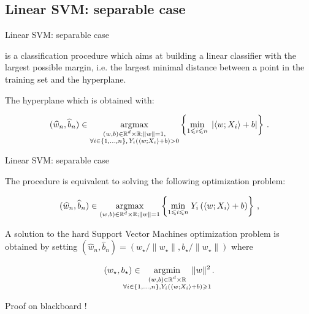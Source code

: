\documentclass[xcolor={usenames,dvipsnames}]{beamer}
\begin{document}
\subsection{Linear SVM: separable case}

\begin{frame}{Linear SVM: separable case}

  is a classification procedure which aims at  building a linear classifier with the largest possible margin, i.e. \alert{the largest minimal distance between a point in the training set and the hyperplane}.

\vspace{.5cm}

The hyperplane which  is obtained with:

\vspace{.3cm}
\[
(\widehat w_n,\widehat b_n)\in \underset{\substack{(w,b)\in\mathbb{R}^d\times \mathbb{R}; \|w\|=1,\\ \forall i\in\{1,\ldots,n\},\, Y_i\left(\langle w; X_i\rangle + b\right) > 0}}{\operatorname{argmax}}\left\{\underset{1\leqslant i \leqslant n}{\min}\;\left|\langle w; X_i\rangle + b\right|\right\}\,.
\]
\end{frame}

\begin{frame}{Linear SVM: separable case}

The  procedure is equivalent to solving the following optimization problem:

\vspace{.3cm}
\[
(\widehat w_n,\widehat b_n)\in \underset{(w,b)\in\mathbb{R}^d\times \mathbb{R}; \|w\|=1}{\operatorname{argmax}}\left\{\underset{1\leqslant i \leqslant n}{\min}\;Y_i\left(\langle w; X_i\rangle + b\right)\right\}\,,
\]

\vspace{.5cm}

A \alert{solution to the hard Support Vector Machines optimization} problem is obtained by setting  $(\widehat w_n,\widehat b_n) = (w_\star/\|w_\star\|,b_\star/\|w_\star\|)$ where

\begin{equation*}
(w_\star,b_\star)\in  \hspace{-.8cm}  \underset{\substack{(w,b)\in\mathbb{R}^d\times \mathbb{R}\\ \forall i\in\{1,\ldots,n\}, Y_i\left(\langle w; X_i\rangle + b\right)\geqslant 1}}{\argmin} \hspace{-.8cm} \|w\|^2\,.
\end{equation*}

\vspace{.2cm}

\centering
{\color{Vert} Proof on blackboard !}
\end{frame}
\end{document}
